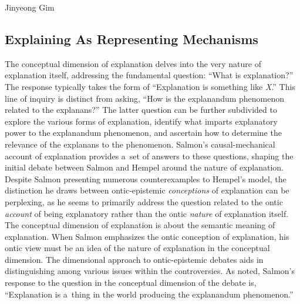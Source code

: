 \begin{artengenv}{Jinyeong Gim}
\subsection{Explaining As Representing Mechanisms}

The conceptual dimension of explanation delves into the very nature of explanation itself, addressing the fundamental question: ``What is explanation?'' The response typically takes the form of ``Explanation is something like \textit{X}.'' This line of inquiry is distinct from asking, ``How is the explanandum phenomenon related to the explanans?'' The latter question can be further subdivided to explore the various forms of explanation, identify what imparts explanatory power to the explanandum phenomenon, and ascertain how to determine the relevance of the explanans to the phenomenon. Salmon's causal-mechanical account of explanation provides a~set of answers to these questions, shaping the initial debate between Salmon and Hempel around the nature of explanation. Despite Salmon presenting numerous counterexamples to Hempel's model, the distinction he draws between ontic-epistemic \textit{conceptions} of explanation can be perplexing, as he seems to primarily address the question related to the ontic \textit{account} of being explanatory rather than the ontic \textit{nature} of explanation itself. The conceptual dimension of explanation is about the semantic meaning of explanation. When Salmon emphasizes the ontic conception of explanation, his ontic view must be an idea of the nature of explanation in the conceptual dimension. The dimensional approach to ontic-epistemic debates aids in distinguishing among various issues within the controversies. As noted, Salmon's response to the question in the conceptual dimension of the debate is, ``Explanation is a~thing in the world producing the explanandum phenomenon.''


\end{artengenv}
